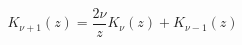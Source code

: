 \documentclass[12pt]{article}
\begin{document}
\begin{displaymath}
K_{\nu+1}(z) = \frac{2\nu}{z}K_\nu(z) + K_{\nu-1}(z)
\end{displaymath}
\end{document}
